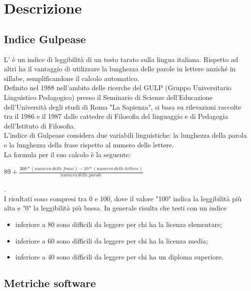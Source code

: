 \newpage
\section{Descrizione}%
\label{3}
\subsection{Indice Gulpease} %
\label{3.1}
L' è un indice di leggibilità di un testo tarato sulla lingua italiana. Rispetto ad altri ha il vantaggio di utilizzare la lunghezza delle parole in lettere anziché in sillabe, semplificandone il calcolo automatico.\\
Definito nel 1988 nell'ambito delle ricerche del GULP (Gruppo Universitario Linguistico Pedagogico) presso il Seminario di Scienze dell'Educazione dell'Università degli studi di Roma "La Sapienza", si basa su rilevazioni raccolte tra il 1986 e il 1987 dalle cattedre di Filosofia del linguaggio e di Pedagogia dell'Istituto di Filosofia.\\
L'indice di Gulpease considera due variabili linguistiche: la lunghezza della parola e la lunghezza della frase rispetto al numero delle lettere.\\
La formula per il suo calcolo è la seguente:
\\
\begin{center}
\begin{math}
89+\frac{300*(numero\:delle\:frasi)-10*(numero\:delle\:lettere)}{numero\:delle\:parole}
\end{math}
\end{center}
.\\
I risultati sono compresi tra 0 e 100, dove il valore "100" indica la leggibilità più alta e "0" la leggibilità più bassa. In generale risulta che testi con un indice
\begin{itemize}
\item inferiore a 80 sono difficili da leggere per chi ha la licenza elementare;
\item inferiore a 60 sono difficili da leggere per chi ha la licenza media;
\item inferiore a 40 sono difficili da leggere per chi ha un diploma superiore.
\end{itemize}

\subsection{Metriche software} %
